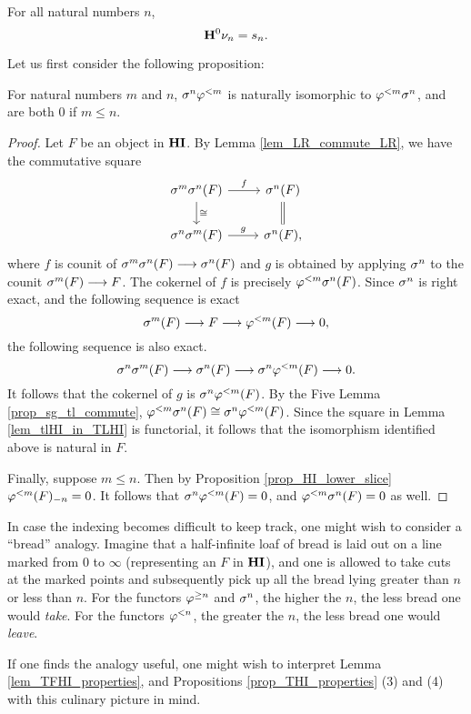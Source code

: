 \begin{cor}\label{cor_H_commute_with_slice}
For all natural numbers $n$,
\[
\HH^0 \sliceDM{n} = \slice{n}.
\]
\end{cor}

Let us first consider the following proposition:

\begin{prop}\label{prop_sg_tl_commute}
For natural numbers $m$ and $n$, $\sgHI{n} \tlHI{m}$ is naturally
isomorphic to $\tlHI{m} \sgHI{n}$, and are both 0 if $m \leq n$.
\end{prop}
\begin{proof}
Let $F$ be an object in $\HI$. By Lemma \ref{lem_LR_commute_LR}, 
we have the commutative square
\begin{equation}\label{eq_prop_sg_tl_com_sq}
\begin{tikzcd}
\sgHI{m}\sgHI{n}(F) \arrow{r}{f} \arrow{d}{\cong} & 
\sgHI{n}(F) \arrow[equal]{d} \\
\sgHI{n}\sgHI{m}(F) \arrow{r}{g} &
\sgHI{n}(F),
\end{tikzcd}
\end{equation}
where $f$ is counit of $\sgHI{m}\sgHI{n}(F) \to \sgHI{n}(F)$ and 
$g$ is obtained by applying $\sgHI{n}$ to the counit $\sgHI{m}(F) 
\to F$. The cokernel of $f$ is precisely $\tlHI{m} \sgHI{n}(F)$.
Since $\sgHI{n}$ is right exact, and the
following sequence is exact
\[
\sgHI{m}(F) \to F \to \tlHI{m}(F) \to 0,
\]
the following sequence is also exact.
\[
\sgHI{n} \sgHI{m}(F) \to \sgHI{n}(F) \to \sgHI{n} \tlHI{m}(F) 
   \to 0.
\]
It follows that the cokernel of $g$ is $\sgHI{n} \tlHI{m}(F)$.  By the
Five Lemma \ref{prop_sg_tl_commute}, $\tlHI{m} \sgHI{n}(F) \cong
\sgHI{n} \tlHI{m}(F)$. Since the square in Lemma
\ref{lem_tlHI_in_TLHI} is functorial, it follows that the isomorphism
identified above is natural in $F$.

Finally, suppose $m \leq n$. Then by Proposition 
\ref{prop_HI_lower_slice} $\RHI[n]{\tlHI{m}(F)} = 0$. It follows 
that $\sgHI{n} \tlHI{m}(F) = 0$, and $\tlHI{m} \sgHI{n}(F) = 0$ as 
well.
\end{proof}

\begin{rmk}
  In case the indexing becomes difficult to keep track, one might wish
  to consider a ``bread'' analogy. Imagine that a half-infinite loaf
  of bread is laid out on a line marked from 0 to $\infty$
  (representing an $F$ in $\HI$), and one is allowed to take cuts at
  the marked points and subsequently pick up all the bread lying
  greater than $n$ or less than $n$. For the functors $\tgHI{n}$ and
  $\sgHI{n}$, the higher the $n$, the less bread one would
  \emph{take}. For the functors $\tlHI{n}$, the greater the $n$, the
  less bread one would \emph{leave}.

If one finds the analogy useful, one might wish to interpret
Lemma \ref{lem_TFHI_properties}, and Propositions
\ref{prop_THI_properties} (3) and (4) with this culinary picture 
in mind.
\end{rmk}

